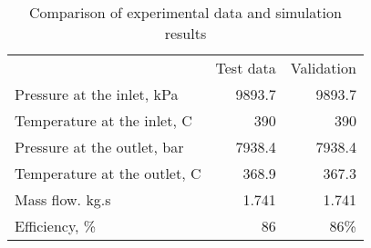 \begin{table}
\caption{Comparison of experimental data and simulation results}
\begin{center}
\begin{tabulary}{0.9\textwidth}{LRR}
& Test data & Validation \\
Pressure at the inlet, kPa & 9893.7 & 9893.7 \\
Temperature at the inlet, C & 390 & 390 \\
Pressure at the outlet, bar & 7938.4 & 7938.4 \\
Temperature at the outlet, C & 368.9 & 367.3 \\
Mass flow. kg.s & 1.741 & 1.741 \\
Efficiency, \% & 86 & 86\% \\
\end{tabulary}
\end{center}
\end{table}